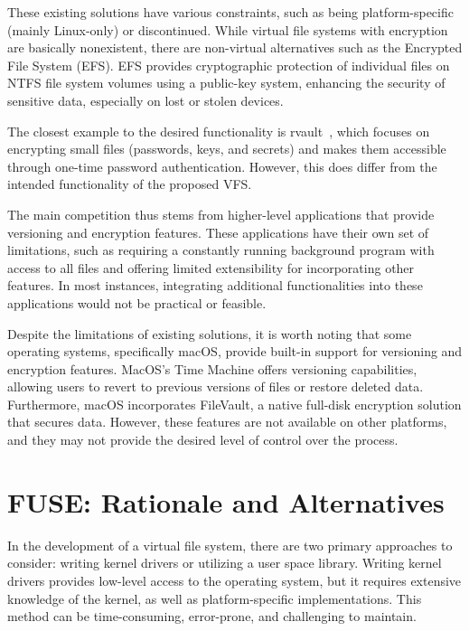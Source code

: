 These existing solutions have various constraints, such as being platform-specific (mainly Linux-only) or discontinued.
While virtual file systems with encryption are basically nonexistent, there are non-virtual alternatives such as the Encrypted File System (EFS).
EFS provides cryptographic protection of individual files on NTFS file system volumes using a public-key system, enhancing the security of sensitive data, especially on lost or stolen devices.

The closest example to the desired functionality is rvault~\cite{rvault}, which focuses on encrypting small files (passwords, keys, and secrets) and makes them accessible through one-time password authentication.
However, this does differ from the intended functionality of the proposed VFS\@.

The main competition thus stems from higher-level applications that provide versioning and encryption features.
These applications have their own set of limitations, such as requiring a constantly running background program with access to all files and offering limited extensibility for incorporating other features.
In most instances, integrating additional functionalities into these applications would not be practical or feasible.

Despite the limitations of existing solutions, it is worth noting that some operating systems, specifically macOS, provide built-in support for versioning and encryption features.
MacOS's Time Machine offers versioning capabilities, allowing users to revert to previous versions of files or restore deleted data.
Furthermore, macOS incorporates FileVault, a native full-disk encryption solution that secures data.
However, these features are not available on other platforms, and they may not provide the desired level of control over the process.

\section{FUSE: Rationale and Alternatives}\label{sec:fuse-analysis}

In the development of a virtual file system, there are two primary approaches to consider: writing kernel drivers or utilizing a user space library.
Writing kernel drivers provides low-level access to the operating system, but it requires extensive knowledge of the kernel, as well as platform-specific implementations.
This method can be time-consuming, error-prone, and challenging to maintain.

